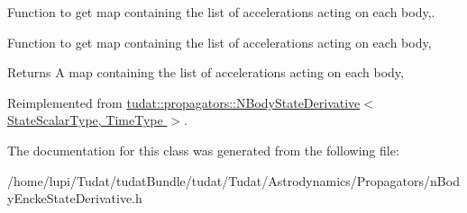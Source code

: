 Function to get map containing the list of accelerations acting on each body,. 

Function to get map containing the list of accelerations acting on each body, \begin{DoxyReturn}{Returns}
A map containing the list of accelerations acting on each body, 
\end{DoxyReturn}


Reimplemented from \hyperlink{classtudat_1_1propagators_1_1NBodyStateDerivative_ace7b03eeaa9a2571af87d578d3b747c7}{tudat\+::propagators\+::\+N\+Body\+State\+Derivative$<$ State\+Scalar\+Type, Time\+Type $>$}.



The documentation for this class was generated from the following file\+:\begin{DoxyCompactItemize}
\item 
/home/lupi/\+Tudat/tudat\+Bundle/tudat/\+Tudat/\+Astrodynamics/\+Propagators/n\+Body\+Encke\+State\+Derivative.\+h\end{DoxyCompactItemize}
